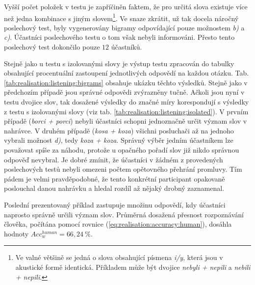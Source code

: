 Vyšší počet položek v testu je zapříčiněn faktem, že pro určitá slova existuje více než jedna kombinace s jiným slovem\footnote{Ve valné většině se jedná o slova obsahující písmena \textit{i/y}, která jsou v akustické formě identická. Příkladem může být dvojice \textit{nebyli + nepili} a \textit{nebili + nepili}.}. Ve snaze zkrátit, už tak docela náročný poslechový test, byly vygenerovány bigramy odpovídající pouze možnostem \textit{b)} a \textit{c)}. Účastníci poslechového testu o tom však nebyli informováni. Přesto tento poslechový test dokončilo pouze $12$ účastníků.

Stejně jako u testu s izolovanými slovy je výstup testu zpracován do tabulky obsahující procentuální zastoupení jednotlivých odpovědí na každou otázku.
Tab. \ref{tab:realisation:listening:bigrams} obsahuje ukázku těchto výsledků.
Stejně jako v předchozím případě jsou správné odpovědi zvýrazněny tučně.
Ačkoli jsou nyní v testu dvojice slov, tak dosažené výsledky do značné míry korespondují s výsledky z testu s izolovanými slovy (viz tab. \ref{tab:realisation:listening:isolated}).
V prvním případě (\textit{borci + porci}) nebyli účastníci schopni jednoznačně určit význam slov v nahrávce.
V druhém případě (\textit{kosa + koza}) všichni posluchači až na jednoho vybrali možnost \textit{d)}, tedy \textit{koza + koza}.
Správný výběr jedním účastníkem lze považovat spíše za náhodu, protože u opačného pořadí slov již nikdo správnou odpověď nevybral.
Je dobré zmínit, že účastníci v žádném z provedených poslechových testů nebyli omezeni počtem opětovného přehrání promluvy.
Tím pádem je velmi pravděpodobné, že tento konkrétní participant opakovaně poslouchal danou nahrávku a hledal rozdíl až nějaký drobný zaznamenal.

Poslední prezentovaný příklad zastupuje množinu odpovědí, kdy účastníci naprosto správně určili význam slov.
Průměrná dosažená přesnost rozpoznávání člověka, počítána pomocí rovnice (\ref{eq:realisation:accuracy:human}), dosáhla hodnoty $Acc_{w}^{human} = 66,24\ \%$.

